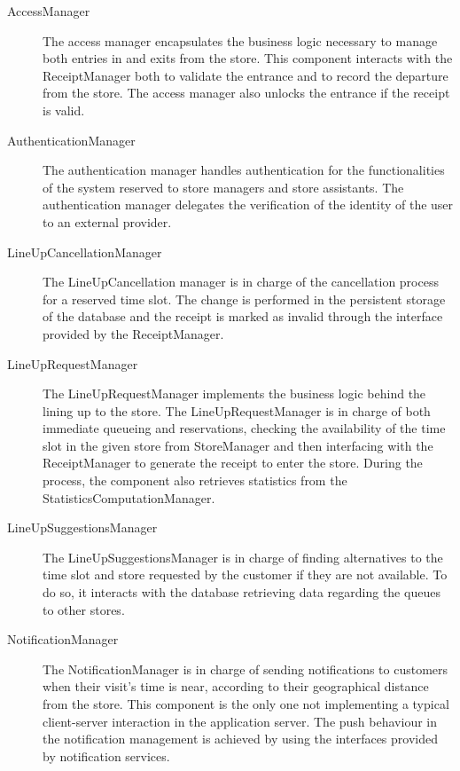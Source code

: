 \documentclass[../../main.tex]{subfiles}
\begin{document}
\begin{description}
    
    \item[AccessManager] The access manager encapsulates the business logic necessary to manage both entries in and exits from the store. 
    This component interacts with the ReceiptManager both to validate the entrance and to record the departure from the store. 
    The access manager also unlocks the entrance if the receipt is valid. 

    \item[AuthenticationManager] The authentication manager handles authentication for the functionalities of the 
    system reserved to store managers and store assistants. The authentication manager delegates the verification of the 
    identity of the user to an external provider.

    \item[LineUpCancellationManager] The LineUpCancellation manager is in charge of the cancellation process for 
    a reserved time slot. The change is performed in the persistent storage of the database and the receipt is marked as 
    invalid through the interface provided by the ReceiptManager.
    
    \item[LineUpRequestManager] The LineUpRequestManager implements the business logic behind the lining up to the store. 
    The LineUpRequestManager is in charge of both immediate queueing and reservations, 
    checking the availability of the time slot in the given store from StoreManager and then interfacing with the 
    ReceiptManager to generate the receipt to enter the store. During the process, the component also retrieves 
    statistics from the StatisticsComputationManager.

    \item[LineUpSuggestionsManager] The LineUpSuggestionsManager is in charge of finding alternatives to the time slot and 
    store requested by the customer if they are not available. To do so, it interacts with the database retrieving data 
    regarding the queues to other stores.

    \item[NotificationManager] The NotificationManager is in charge of sending notifications to customers when their visit's time is near, 
    according to their geographical distance from the store. This component is the only one not implementing a typical 
    client-server interaction in the application server. The push behaviour in the notification management is 
    achieved by using the interfaces provided by notification services.


\end{description}
\end{document}
